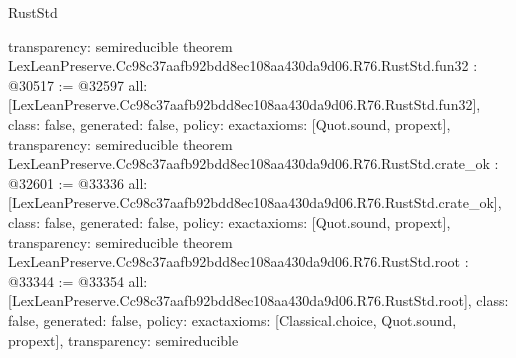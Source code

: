 \begin{lexlean}{RustStd}
\begin{coremodule}
{  transparency: semireducible
}
theorem LexLeanPreserve.Cc98c37aafb92bdd8ec108aa430da9d06.R76.RustStd.fun32 : @30517 := @32597 {
  all: [LexLeanPreserve.Cc98c37aafb92bdd8ec108aa430da9d06.R76.RustStd.fun32],
  class: false,
  generated: false,
  policy: exact{axioms: [Quot.sound, propext]},
  transparency: semireducible
}
theorem LexLeanPreserve.Cc98c37aafb92bdd8ec108aa430da9d06.R76.RustStd.crate_ok : @32601 := @33336 {
  all: [LexLeanPreserve.Cc98c37aafb92bdd8ec108aa430da9d06.R76.RustStd.crate_ok],
  class: false,
  generated: false,
  policy: exact{axioms: [Quot.sound, propext]},
  transparency: semireducible
}
theorem LexLeanPreserve.Cc98c37aafb92bdd8ec108aa430da9d06.R76.RustStd.root : @33344 := @33354 {
  all: [LexLeanPreserve.Cc98c37aafb92bdd8ec108aa430da9d06.R76.RustStd.root],
  class: false,
  generated: false,
  policy: exact{axioms: [Classical.choice, Quot.sound, propext]},
  transparency: semireducible
}


\end{coremodule}
\end{lexlean}
